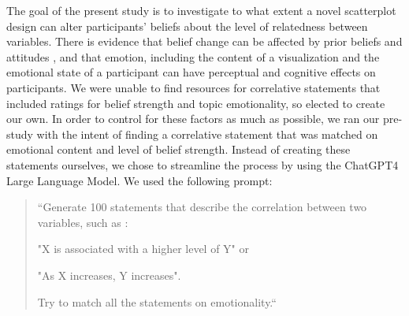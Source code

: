 \documentclass[manuscript,screen,review]{acmart}
\begin{document}
The goal of the present study is to investigate to what extent a novel
scatterplot design can alter participants' beliefs about the level of
relatedness between variables. There is evidence that belief change can
be affected by prior beliefs and attitudes
\citep{xiong_2022, markant_2023}, and that emotion, including the
content of a visualization \citep{phelps_2006, harrison_2013} and the
emotional state of a participant \citep{thoresen_2016} can have
perceptual and cognitive effects on participants. We were unable to find
resources for correlative statements that included ratings for belief
strength and topic emotionality, so elected to create our own. In order
to control for these factors as much as possible, we ran our pre-study
with the intent of finding a correlative statement that was matched on
emotional content and level of belief strength. Instead of creating
these statements ourselves, we chose to streamline the process by using
the ChatGPT4 Large Language Model. We used the following prompt:

\begin{quotation}

    ``Generate 100 statements that describe the correlation between two variables, such as :

     "X is associated with a higher level of Y" or

     "As X increases, Y increases".

    Try to match all the statements on emotionality.``
    
\end{quotation}
\end{document}

